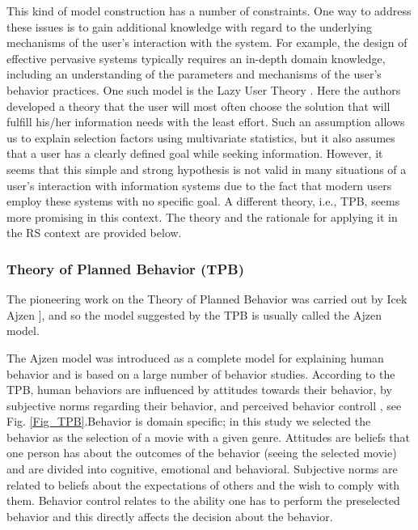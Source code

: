 \documentclass{llncs}
\begin{document}
This kind of model construction has a number of constraints. One way to address these issues is to gain additional knowledge with regard to the underlying mechanisms of the user’s interaction with the system. For example, the design of effective pervasive systems typically requires an in-depth domain knowledge, including an understanding of the parameters and mechanisms of the user’s behavior practices. One such model is the Lazy User Theory \cite{Tetard2009}. Here the authors developed a theory that the user will most often choose the solution that will fulfill his/her information needs with the least effort. Such an assumption allows us to explain selection factors using multivariate statistics, but it also assumes that a user has a clearly defined goal while seeking information. However, it seems that this simple and strong hypothesis is not valid in many situations of a user’s interaction with information systems due to the fact that modern users employ these systems with no specific goal. A different theory, i.e., TPB, seems more promising in this context. The theory and the rationale for applying it in the RS context are provided below. 


\subsubsection{Theory of Planned Behavior (TPB)}\label{SubSubSec_TPB}

 
The pioneering work on the Theory of Planned Behavior was carried out by Icek Ajzen \cite{Ajzen1991}], and so the model suggested by the TPB is usually called the Ajzen model. 

The Ajzen model was introduced as a complete model for explaining human behavior and is based on a large number of behavior studies. According to the TPB, human behaviors are influenced by attitudes towards their behavior, by subjective norms regarding their behavior, and perceived behavior controll \cite{Ajzen1991}, see Fig. \ref{Fig_TPB}.Behavior is domain specific; in this study we selected the behavior as the selection of a movie with a given genre. Attitudes are beliefs that one person has about the outcomes of the behavior (seeing the selected movie) and are divided into cognitive, emotional and behavioral. Subjective norms are related to beliefs about the expectations of others and the wish to comply with them. Behavior control relates to the ability one has to perform the preselected behavior and this directly affects the decision about the behavior. 
\end{document}
